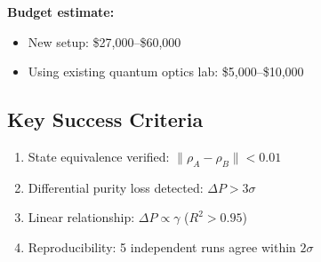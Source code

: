 \documentclass[11pt, onecolumn, letterpaper]{article}
\begin{document}
\textbf{Budget estimate:}
\begin{itemize}
    \item New setup: \$27,000--\$60,000
    \item Using existing quantum optics lab: \$5,000--\$10,000
\end{itemize}

\subsection{Key Success Criteria}
\begin{enumerate}
    \item State equivalence verified: $\|\rho_A - \rho_B\| < 0.01$
    \item Differential purity loss detected: $\Delta P > 3\sigma$
    \item Linear relationship: $\Delta P \propto \gamma$ ($R^2 > 0.95$)
    \item Reproducibility: 5 independent runs agree within $2\sigma$
\end{enumerate}
\end{document}
